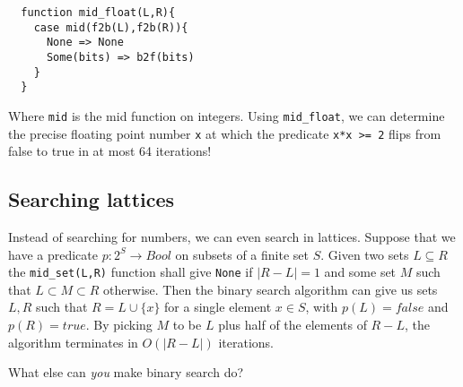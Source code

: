 \documentclass[a4paper, 11pt]{article}
\begin{document}
\begin{lstlisting}
  function mid_float(L,R){
    case mid(f2b(L),f2b(R)){
      None => None
      Some(bits) => b2f(bits)
    }
  }
\end{lstlisting}

\noindent Where \lstinline|mid| is the mid function on integers. Using \lstinline|mid_float|, we can determine the precise floating point number \lstinline|x| at which the predicate \lstinline|x*x >= 2| flips from false to true in at most 64 iterations!

\subsection{Searching lattices}

Instead of searching for numbers, we can even search in lattices. Suppose that we have a predicate $p : 2^S \to Bool$ on subsets of a finite set $S$. Given two sets $L \subseteq R$ the \lstinline|mid_set(L,R)| function shall give \lstinline|None| if $|R - L| = 1$ and some set $M$ such that $L \subset M \subset R$ otherwise. Then the binary search algorithm can give us sets $L,R$ such that $R = L \cup \{x\}$ for a single element $x\in S$, with $p(L) = false$ and $p(R) = true$. By picking $M$ to be $L$ plus half of the elements of $R - L$, the algorithm terminates in $O(|R - L|)$ iterations.

\bigskip

What else can \emph{you} make binary search do?
\end{document}
